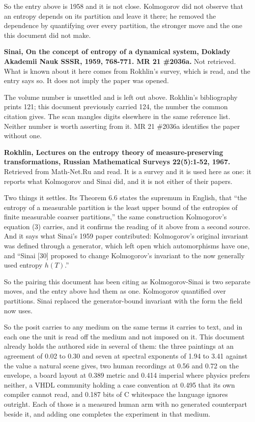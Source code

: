 So the entry above is 1958 and it is not close. Kolmogorov did not observe that an entropy depends on its partition and leave it there; he removed the dependence by quantifying over every partition, the stronger move and the one this document did not make.

\textbf{Sinai, On the concept of entropy of a dynamical system, Doklady Akademii Nauk SSSR, 1959, 768-771. MR 21 \#2036a.} Not retrieved. What is known about it here comes from Rokhlin's survey, which is read, and the entry says so. It does not imply the paper was opened.

The volume number is unsettled and is left out above. Rokhlin's bibliography prints 121; this document previously carried 124, the number the common citation gives. The scan mangles digits elsewhere in the same reference list. Neither number is worth asserting from it. MR 21 \#2036a identifies the paper without one.

\textbf{Rokhlin, Lectures on the entropy theory of measure-preserving transformations, Russian Mathematical Surveys 22(5):1-52, 1967.} Retrieved from Math-Net.Ru and read. It is a survey and it is used here as one: it reports what Kolmogorov and Sinai did, and it is not either of their papers.

Two things it settles. Its Theorem 6.6 states the supremum in English, that ``the entropy of a measurable partition is the least upper bound of the entropies of finite measurable coarser partitions,'' the same construction Kolmogorov's equation (3) carries, and it confirms the reading of it above from a second source. And it says what Sinai's 1959 paper contributed: Kolmogorov's original invariant was defined through a generator, which left open which automorphisms have one, and ``Sinai [30] proposed to change Kolmogorov's invariant to the now generally used entropy \(h(T)\).''

So the pairing this document has been citing as Kolmogorov-Sinai is two separate moves, and the entry above had them as one. Kolmogorov quantified over partitions. Sinai replaced the generator-bound invariant with the form the field now uses.

So the posit carries to any medium on the same terms it carries to text, and in each one the unit is read off the medium and not imposed on it. This document already holds the authored side in several of them: the three paintings at an agreement of 0.02 to 0.30 and seven at spectral exponents of 1.94 to 3.41 against the value a natural scene gives, two human recordings at 0.56 and 0.72 on the envelope, a board layout at 0.389 metric and 0.414 imperial where physics prefers neither, a VHDL community holding a case convention at 0.495 that its own compiler cannot read, and 0.187 bits of C whitespace the language ignores outright. Each of those is a measured human arm with no generated counterpart beside it, and adding one completes the experiment in that medium.

